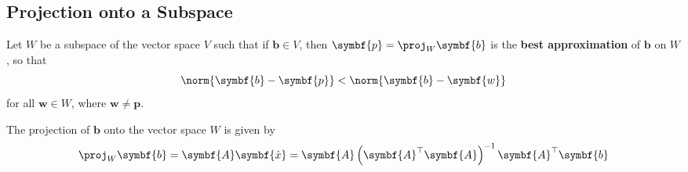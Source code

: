 \documentclass{article}
\begin{document}
\subsection{Projection onto a Subspace}
\begin{theorem}
    Let \(W\) be a subspace of the vector space \(V\) such that if
    \(\symbf{b}\in V\), then \(\symbf{p}=\proj_{W}\symbf{b}\) is
    the \textbf{best approximation} of \(\symbf{b}\) on \(W\), so that
    \begin{equation*}
        \norm{\symbf{b}-\symbf{p}}<\norm{\symbf{b}-\symbf{w}}
    \end{equation*}
    for all \(\symbf{w}\in W\), where \(\symbf{w}\neq \symbf{p}\).
\end{theorem}
\begin{theorem}
    The projection of \(\symbf{b}\) onto the vector space \(W\) is
    given by
    \begin{equation*}
        \proj_{W}\symbf{b} = \symbf{A}\symbf{\hat{x}} = \symbf{A}\left( \symbf{A}^\top \symbf{A} \right)^{-1}\symbf{A}^\top \symbf{b}
    \end{equation*}
\end{theorem}
\end{document}
